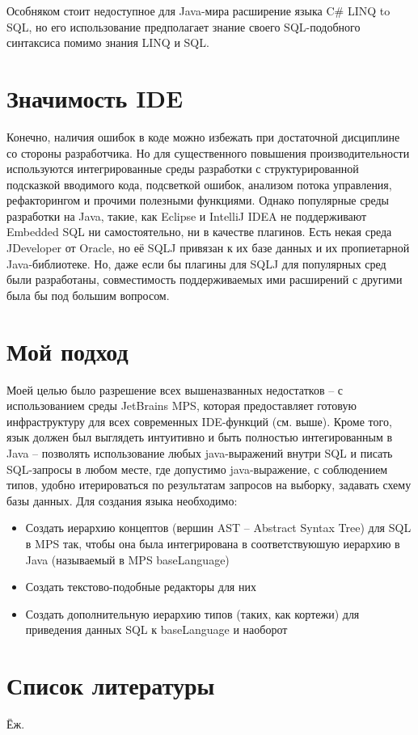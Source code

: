 \documentclass[12pt]{article}
\begin{document}
Особняком стоит недоступное для Java-мира расширение языка C\# LINQ to SQL, но его использование предполагает знание своего SQL-подобного синтаксиса помимо знания LINQ и SQL.\\

\section{Значимость IDE}
Конечно, наличия ошибок в коде можно избежать при достаточной дисциплине со стороны разработчика. Но для существенного повышения производительности используются интегрированные среды разработки с структурированной подсказкой вводимого кода, подсветкой ошибок, анализом потока управления, рефакторингом и прочими полезными функциями. Однако популярные среды разработки на Java, такие, как Eclipse и IntelliJ IDEA не поддерживают Embedded SQL ни самостоятельно, ни в качестве плагинов. Есть некая среда JDeveloper от Oracle, но её SQLJ привязан к их базе данных и их пропиетарной Java-библиотеке. Но, даже если бы плагины для SQLJ для популярных сред были разработаны, совместимость поддерживаемых ими расширений с другими была бы под большим вопросом.

\section{Мой подход}
Моей целью было разрешение всех вышеназванных недостатков -- с использованием среды JetBrains MPS, которая предоставляет готовую инфраструктуру для всех современных IDE-функций (см. выше). Кроме того, язык должен был выглядеть интуитивно и быть полностью интегированным в Java -- позволять использование любых java-выражений внутри SQL и писать SQL-запросы в любом месте, где допустимо java-выражение, с соблюдением типов, удобно итерироваться по результатам запросов на выборку, задавать схему базы данных. Для создания языка необходимо:
\begin{itemize}
\item Создать иерархию концептов (вершин AST -- Abstract Syntax Tree) для SQL в MPS так, чтобы она была интегрирована в соответствуюшую иерархию в Java (называемый в MPS baseLanguage)
\item Создать текстово-подобные редакторы для них
\item Создать дополнительную иерархию типов (таких, как кортежи) для приведения данных SQL к baseLanguage и наоборот
\end{itemize}
	
\section{Список литературы}
Ёж.
\end{document}
